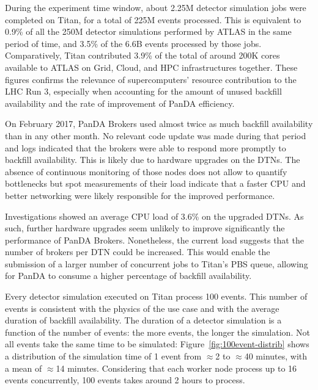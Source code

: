 During the experiment time window, about 2.25M detector simulation jobs were
completed on Titan, for a total of 225M events processed. This is equivalent to
0.9\% of all the 250M detector simulations performed by ATLAS in the same period
of time, and 3.5\% of the 6.6B events processed by those jobs. Comparatively,
Titan contributed 3.9\% of the total of around 200K cores available to ATLAS on
Grid, Cloud, and HPC infrastructures together. These figures confirms the
relevance of supercomputers' resource contribution to the LHC Run 3, especially
when accounting for the amount of unused backfill availability and the rate of
improvement of PanDA efficiency.


On February 2017, PanDA Brokers used almost twice as much backfill availability
than in any other month. No relevant code update was made during that period and
logs indicated that the brokers were able to respond more promptly to backfill
availability. This is likely due to hardware upgrades on the DTNs. The absence
of continuous monitoring of those nodes does not allow to quantify bottlenecks
but spot measurements of their load indicate that a faster CPU and better
networking were likely responsible for the improved performance.

Investigations showed an average CPU load of 3.6\% on the upgraded DTNs. As
such, further hardware upgrades seem unlikely to improve significantly the
performance of PanDA Brokers. Nonetheless, the current load suggests that the
number of brokers per DTN could be increased. This would enable the submission
of a larger number of concurrent jobs to Titan's PBS queue, allowing for PanDA
to consume a higher percentage of backfill availability.

Every detector simulation executed on Titan process 100 events. This number of
events is consistent with the physics of the use case and with the average
duration of backfill availability. The duration of a detector simulation is a
function of the number of events: the more events, the longer the simulation.
Not all events take the same time to be simulated:
Figure~\ref{fig:100event-distrib} shows a distribution of the simulation time of
1 event from $\approx$2 to $\approx$40 minutes, with a mean of $\approx$14
minutes. Considering that each worker node process up to 16 events concurrently,
100 events takes around 2 hours to process.

